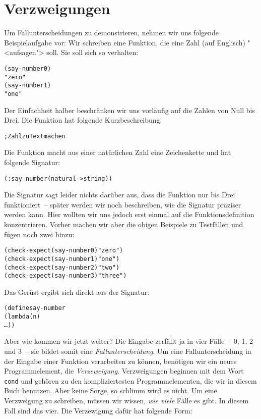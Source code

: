 \section{Verzweigungen}

Um Fallunterscheidungen zu demonstrieren, nehmen wir uns folgende
Beispielaufgabe vor: Wir schreiben eine Funktion, die eine Zahl (auf
Englisch) "<aufsagen"> soll.  Sie soll sich so verhalten:
%
\begin{alltt}
(say-number 0)
\evalsto{} "zero"
(say-number 1)
\evalsto{} "one"
\end{alltt}
%
Der Einfachheit halber beschränken wir uns vorläufig auf die Zahlen
von Null bis Drei.  Die Funktion hat folgende Kurzbeschreibung:
%
\begin{alltt}
; Zahl zu Text machen
\end{alltt}
%
Die Funktion macht aus einer natürlichen Zahl eine Zeichenkette und
hat folgende Signatur:
%
\begin{alltt}
(: say-number (natural -> string))
\end{alltt}
%
Die Signatur sagt leider nichts darüber aus, dass die Funktion nur bis
Drei funktioniert~-- später werden wir noch beschreiben, wie die
Signatur präziser werden kann.  Hier wollten wir uns jedoch erst
einmal auf die Funktionsdefinition konzentrieren.  Vorher machen wir
aber die obigen Beispiele zu Testfällen und fügen noch zwei hinzu:
%
\begin{alltt}
(check-expect (say-number 0) "zero")
(check-expect (say-number 1) "one")
(check-expect (say-number 2) "two")
(check-expect (say-number 3) "three")
\end{alltt}
%
Das Gerüst ergibt sich direkt aus der Signatur:
%
\begin{alltt}
(define say-number
  (lambda (n)
    \ldots))
\end{alltt}
%
Aber wie kommen wir jetzt weiter?  Die Eingabe zerfällt ja in vier
Fälle~-- 0, 1, 2 und 3~-- sie bildet somit eine
\textit{Fallunterscheidung}.  Um eine
Fallunterscheidung in der Eingabe einer Funktion verarbeiten zu können,
benötigen wir ein neues Programmelement, die
\textit{Verzeweigung}.  Verzweigungen beginnen mit
dem Wort \texttt{cond} und gehören zu den kompliziertesten
Programmelementen, die wir in diesem Buch benutzen.  Aber keine Sorge,
so schlimm wird es nicht.  Um eine Verzweigung zu schreiben, müssen
wir wissen, \emph{wie viele} Fälle es gibt.  In diesem Fall sind das
vier.  Die Verzewigung dafür hat folgende Form:
%

